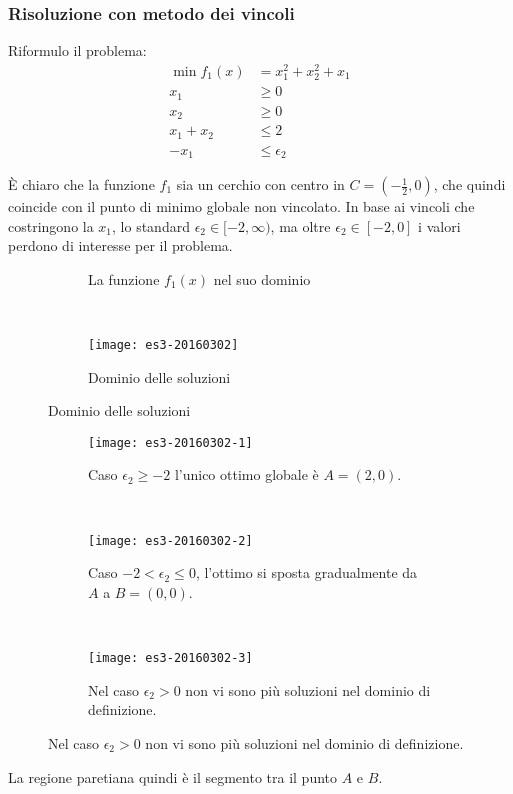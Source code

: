 \documentclass[\main/main.tex]{subfiles}
\begin{document}
\subsubsection*{Risoluzione con metodo dei vincoli}
Riformulo il problema:
\begin{align*}
  \min f_1(x) & = x_1^2 + x_2^2 + x_1 \\
  x_1         & \geq 0                \\
  x_2         & \geq 0                \\
  x_1 + x_2   & \leq 2                \\
  -x_1        & \leq \epsilon_2
\end{align*}

È chiaro che la funzione $f_1$ sia un cerchio con centro in $C = (-\frac{1}{2}, 0)$, che quindi coincide con il punto di minimo globale non vincolato. In base ai vincoli che costringono la $x_1$, lo standard $\epsilon_2 \in [-2, \infty)$, ma oltre $\epsilon_2 \in [-2, 0]$ i valori perdono di interesse per il problema.

\begin{figure}
  \begin{subfigure}{0.45\textwidth}
    \caption{La funzione $f_1(x)$ nel suo dominio}
  \end{subfigure}
  ~
  \begin{subfigure}{0.45\textwidth}
    \texttt{[image: es3-20160302]}
    \caption{Dominio delle soluzioni}
  \end{subfigure}
\end{figure}

\begin{figure}
  \begin{subfigure}{0.32\textwidth}
    \texttt{[image: es3-20160302-1]}
    \caption{Caso $\epsilon_2 \geq -2$ l'unico ottimo globale è $A = (2,0)$.}
  \end{subfigure}
  ~
  \begin{subfigure}{0.32\textwidth}
    \texttt{[image: es3-20160302-2]}
    \caption{Caso $-2<\epsilon_2 \leq 0$, l'ottimo si sposta gradualmente da $A$ a $B = (0,0)$.}
  \end{subfigure}
  ~
  \begin{subfigure}{0.32\textwidth}
    \texttt{[image: es3-20160302-3]}
    \caption{Nel caso $\epsilon_2 > 0$ non vi sono più soluzioni nel dominio di definizione.}
  \end{subfigure}
\end{figure}

La regione paretiana quindi è il segmento tra il punto $A$ e $B$.
\end{document}
